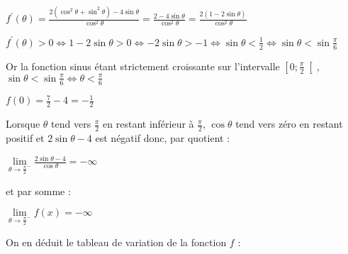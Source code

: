 \begin{corrige}
\begin{enumerate}
          \par
          $f^{\prime}\left(\theta \right)=\frac{2\left(\cos^{2}\theta +\sin^{2}\theta \right)-4\sin \theta }{\cos^{2}\theta }=\frac{2-4\sin \theta }{\cos^{2}\theta }=\frac{2\left(1-2\sin \theta \right)}{\cos^{2}\theta }$
          \par
          $f^{\prime}\left(\theta \right) > 0  \Leftrightarrow   1-2\sin \theta  > 0  \Leftrightarrow  -2\sin \theta  > -1 \Leftrightarrow  \sin \theta  < \frac{1}{2}  \Leftrightarrow   \sin \theta  < \sin \frac{\pi }{6}$
          \par
          Or la fonction sinus étant strictement croissante sur l'intervalle $\left[0 ; \frac{\pi }{2}\right[$, $\sin \theta  < \sin \frac{\pi }{6}  \Leftrightarrow   \theta  < \frac{\pi }{6}$
          \par
          $f\left(0\right)=\frac{7}{2}-4=-\frac{1}{2}$
          \par
          Lorsque $\theta $ tend vers $\frac{\pi }{2}$ en restant inférieur à $\frac{\pi }{2}$, $\cos \theta $ tend vers zéro en restant positif et $2 \sin \theta -4$ est négatif donc, par quotient :
          \par
          $\lim\limits_{\theta \rightarrow \frac{\pi }{2}^-}\frac{2 \sin \theta -4}{\cos \theta }=-\infty $
          \par
          et par somme :
          \par
          $\lim\limits_{\theta \rightarrow \frac{\pi }{2}^-}f\left(x\right)=-\infty $
          \par
          On en déduit le tableau de variation de la fonction $f$ :
\begin{center}
 \begin{extern}%
\end{extern}
\end{center}
\end{enumerate}
\end{corrige}
